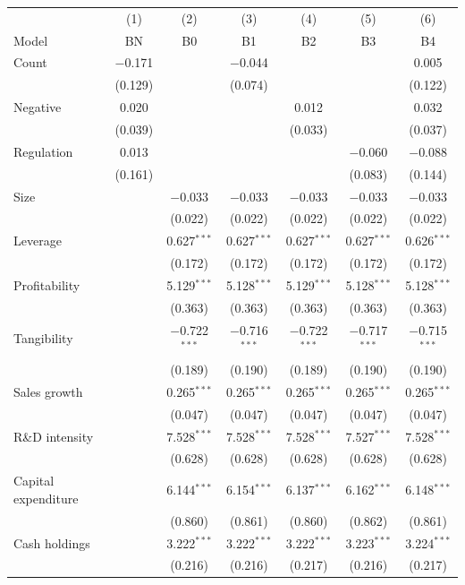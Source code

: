 \begin{tabular}{lcccccc}
\toprule
 & (1) & (2) & (3) & (4) & (5) & (6) \\
Model & BN & B0 & B1 & B2 & B3 & B4 \\
\midrule
Count & $-$0.171 &  & $-$0.044 &  &  & 0.005 \\
 & (0.129) &  & (0.074) &  &  & (0.122) \\
Negative & 0.020 &  &  & 0.012 &  & 0.032 \\
 & (0.039) &  &  & (0.033) &  & (0.037) \\
Regulation & 0.013 &  &  &  & $-$0.060 & $-$0.088 \\
 & (0.161) &  &  &  & (0.083) & (0.144) \\
Size &  & $-$0.033 & $-$0.033 & $-$0.033 & $-$0.033 & $-$0.033 \\
 &  & (0.022) & (0.022) & (0.022) & (0.022) & (0.022) \\
Leverage &  & 0.627$^{***}$ & 0.627$^{***}$ & 0.627$^{***}$ & 0.627$^{***}$ & 0.626$^{***}$ \\
 &  & (0.172) & (0.172) & (0.172) & (0.172) & (0.172) \\
Profitability &  & 5.129$^{***}$ & 5.128$^{***}$ & 5.129$^{***}$ & 5.128$^{***}$ & 5.128$^{***}$ \\
 &  & (0.363) & (0.363) & (0.363) & (0.363) & (0.363) \\
Tangibility &  & $-$0.722$^{***}$ & $-$0.716$^{***}$ & $-$0.722$^{***}$ & $-$0.717$^{***}$ & $-$0.715$^{***}$ \\
 &  & (0.189) & (0.190) & (0.189) & (0.190) & (0.190) \\
Sales growth &  & 0.265$^{***}$ & 0.265$^{***}$ & 0.265$^{***}$ & 0.265$^{***}$ & 0.265$^{***}$ \\
 &  & (0.047) & (0.047) & (0.047) & (0.047) & (0.047) \\
R\&D intensity &  & 7.528$^{***}$ & 7.528$^{***}$ & 7.528$^{***}$ & 7.527$^{***}$ & 7.528$^{***}$ \\
 &  & (0.628) & (0.628) & (0.628) & (0.628) & (0.628) \\
Capital expenditure &  & 6.144$^{***}$ & 6.154$^{***}$ & 6.137$^{***}$ & 6.162$^{***}$ & 6.148$^{***}$ \\
 &  & (0.860) & (0.861) & (0.860) & (0.862) & (0.861) \\
Cash holdings &  & 3.222$^{***}$ & 3.222$^{***}$ & 3.222$^{***}$ & 3.223$^{***}$ & 3.224$^{***}$ \\
 &  & (0.216) & (0.216) & (0.217) & (0.216) & (0.217) \\

\end{tabular}
